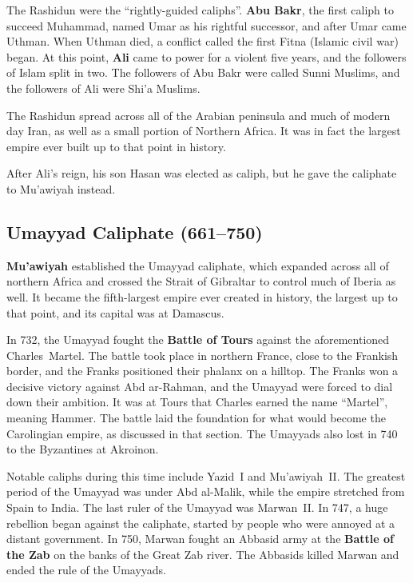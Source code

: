 The Rashidun were the ``rightly-guided caliphs''.
\textbf{Abu Bakr}, the first caliph to succeed Muhammad, named Umar as his rightful successor,
and after Umar came Uthman.
When Uthman died, a conflict called the first Fitna (Islamic civil war) began.
At this point, \textbf{Ali} came to power for a violent five years,
and the followers of Islam split in two.
The followers of Abu Bakr were called Sunni Muslims, and the followers of Ali were Shi'a Muslims.

The Rashidun spread across all of the Arabian peninsula and much of modern day Iran,
as well as a small portion of Northern Africa.
It was in fact the largest empire ever built up to that point in history.

After Ali's reign, his son Hasan was elected as caliph, but he gave the caliphate to Mu'awiyah instead.

\subsection*{Umayyad Caliphate (661--750)}

\textbf{Mu'awiyah} established the Umayyad caliphate, which expanded across all of northern Africa
and crossed the Strait of Gibraltar to control much of Iberia as well.
It became the fifth-largest empire ever created in history, the largest up to that point,
and its capital was at Damascus.

In 732, the Umayyad fought the \textbf{Battle of Tours} against the aforementioned Charles~Martel.
The battle took place in northern France, close to the Frankish border,
and the Franks positioned their phalanx on a hilltop.
The Franks won a decisive victory against Abd ar-Rahman, and the Umayyad were forced to dial down their ambition.
It was at Tours that Charles earned the name ``Martel'', meaning Hammer.
The battle laid the foundation for what would become the Carolingian empire, as discussed in that section.
The Umayyads also lost in 740 to the Byzantines at Akroinon.

Notable caliphs during this time include Yazid~I and Mu'awiyah~II\@.
The greatest period of the Umayyad was under Abd al-Malik, while the empire stretched from Spain to India.
The last ruler of the Umayyad was Marwan~II\@.
In 747, a huge rebellion began against the caliphate, started by people who were annoyed at a distant government.
In 750, Marwan fought an Abbasid army at the \textbf{Battle of the Zab} on the banks of the Great Zab river.
The Abbasids killed Marwan and ended the rule of the Umayyads.

